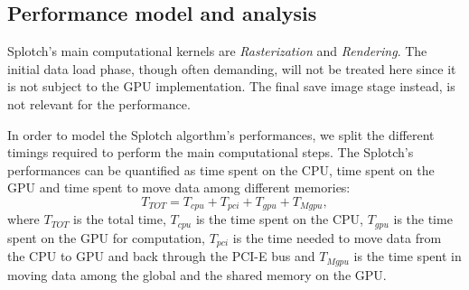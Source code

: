 \documentclass[11pt]{article}
\begin{document}
\subsection{Performance model and analysis}
\label{sec:model}

Splotch's main computational kernels are {\it Rasterization} and {\it Rendering}.
The initial data load phase, though often demanding, will not be treated
here since it is not subject to the GPU implementation. The final save image stage
instead, is not relevant for the performance.

%


In order to model the Splotch algorthm's performances, we split the different timings
required to perform the main computational steps. 
The Splotch's performances can be quantified as time spent on the CPU, time spent on the GPU
and time spent to move data among different memories:
\begin{equation}\label{Ts}
T_{TOT} = T_{cpu} + T_{pci} + T_{gpu} + T_{Mgpu},
\end{equation}
where $T_{TOT}$ is the total time, 
$T_{cpu}$ is the time spent on the CPU, $T_{gpu}$ is the time
spent on the GPU for computation, $T_{pci}$ is the time needed to move data from
the CPU to GPU and back through the PCI-E bus and $T_{Mgpu}$ is the time 
spent in moving data among the global and the shared memory on the GPU.
\end{document}
